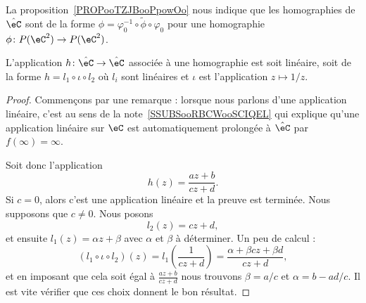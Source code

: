 \begin{normaltext}      \label{NORMooCVYKooYvjIeE}
    La proposition~\ref{PROPooTZJBooPpowOo} nous indique que les homographies de \( \hat \eC\) sont de la forme \( \phi=\varphi_0^{-1}\circ\tilde \phi\circ\varphi_0\) pour une homographie \( \phi\colon P(\eC^2)\to P(\eC^2)\).
\end{normaltext}

\begin{proposition}      \label{PROPooSQFOooRginjJ}
    L'application \( h\colon \hat\eC\to \hat \eC\) associée à une homographie est soit linéaire, soit de la forme \( h=l_1\circ \iota\circ l_2\) où \( l_i\) sont linéaires et \( \iota\) est l'application \( z\mapsto 1/z\).
\end{proposition}

\begin{proof}
    Commençons par une remarque : lorsque nous parlons d'une application linéaire, c'est au sens de la note~\ref{SSUBSooRBCWooSCIQEL} qui explique qu'une application linéaire sur \( \eC\) est automatiquement prolongée à \( \hat \eC\) par \( f(\infty)=\infty\).

    Soit donc l'application
    \begin{equation}
        h(z)=\frac{ az+b }{ cz+d }.
    \end{equation}
    Si \( c=0\), alors c'est une application linéaire et la preuve est terminée. Nous supposons que \( c\neq 0\). Nous posons
    \begin{equation}
        l_2(z)=cz+d,
    \end{equation}
    et ensuite \( l_1(z)=\alpha z+\beta\) avec \( \alpha\) et \( \beta\) à déterminer. Un peu de calcul :
    \begin{equation}
        (l_1\circ \iota\circ l_2)(z)=l_1\left( \frac{1}{ cz+d } \right)=\frac{ \alpha+\beta c z+\beta d }{ cz+d },
    \end{equation}
    et en imposant que cela soit égal à \( \frac{ az+b }{ cz+d }\) nous trouvons \( \beta=a/c\) et \( \alpha=b-ad/c\). Il est vite vérifier que ces choix donnent le bon résultat.
\end{proof}


